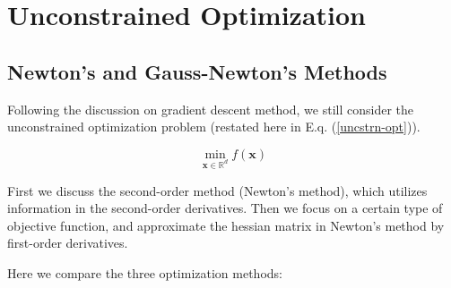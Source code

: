 \chapter{Unconstrained Optimization}
\graphicspath{{../../img/img-2-3/}}

\section{Newton's and Gauss-Newton's Methods}

Following the discussion on gradient descent method, we still consider the 
unconstrained optimization problem (restated here in E.q. (\ref{uncstrn-opt})).

\begin{equation}
    \min_{\textbf{x}\in \mathbb{R}^d}{f(\textbf{x})}
    \label{uncstrn-opt}
\end{equation}

First we discuss the second-order method (Newton's method), which utilizes information
in the second-order derivatives. Then we focus on a certain type of objective function,
and approximate the hessian matrix in Newton's method by first-order derivatives.

Here we compare the three optimization methods:

